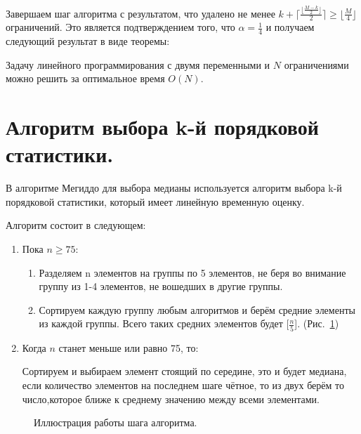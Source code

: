\documentclass[12pt,a4paper]{article}
\begin{document}
Завершаем шаг алгоритма с результатом, что удалено не менее $k+\lceil \frac {\lfloor\frac{M-k}{2}\rfloor}{2}\rceil \geqslant \lfloor\frac{M}{4}\rfloor$ ограничений. Это является подтверждением того, что $\alpha = \frac{1}{4}$ и получаем следующий результат в виде теоремы: \par
\begin{theorem}
Задачу линейного программирования с двумя переменными и $N$ ограничениями можно решить за оптимальное время $O(N)$. 
\end{theorem}



\newpage
\section{Алгоритм выбора k-й порядковой статистики.}
В алгоритме Мегиддо для выбора медианы используется алгоритм выбора  k-й порядковой статистики, который имеет линейную временную оценку.\cite{Hopk00}\par
Алгоритм состоит в следующем:\par
\begin{enumerate}
\item Пока  $n\geqslant 75$:\par
\begin{enumerate}
\item Разделяем n элементов на группы по 5 элементов, не беря во внимание группу из 1-4 элементов, не вошедших в другие группы. 
\item Сортируем каждую группу любым алгоритмов и берём средние элементы из каждой группы. Всего таких средних элементов будет [$\frac{n}{5}$]. (Рис.~\ref{ris:m5})
\end{enumerate}
\item Когда $n$ станет меньше или равно 75, то:\par
Сортируем и выбираем элемент стоящий по середине, это и будет медиана, если количество элементов на последнем шаге чётное, то из двух берём то число,которое ближе к среднему значению между всеми элементами. 
\end{enumerate}

\begin{figure}[h]
\caption{Иллюстрация работы шага алгоритма.}
\label{ris:m5}
\end{figure}
\end{document}
